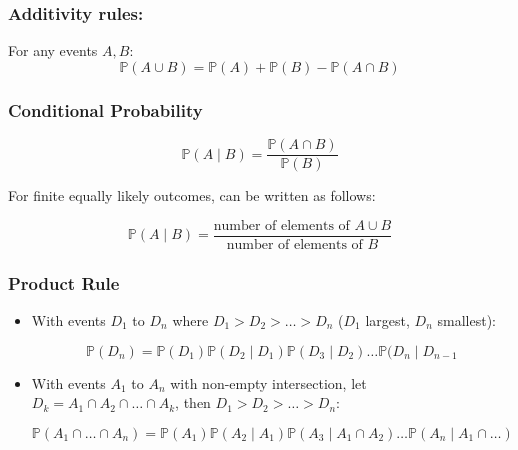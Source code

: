 \documentclass[10pt]{article}
\begin{document}

\begin{multicols}{2}
\subsubsection*{Additivity rules:}

For any events $A, B$:
\begin{equation}
  \tag{Event Union}
  \boxed{
    \mathbb{P}(A \cup B) = \mathbb{P}(A) + \mathbb{P}(B) -
    \mathbb{P}(A \cap B)
  }
\end{equation}


\columnbreak
\subsubsection*{Conditional Probability}

\begin{equation}
  \tag{Conditional Probability Def}
  \boxed{
    \mathbb{P}(A \mid B) = \frac{\mathbb{P}(A \cap B)}{\mathbb{P}(B)}
  }
\end{equation}

For finite equally likely outcomes, can be written as follows:

\begin{equation}
  \boxed{
    \mathbb{P}(A \mid B) = \frac{\text{number of elements of } A \cup
      B}{\text{number of elements of } B}
  }
\end{equation}
\end{multicols}

\subsubsection*{Product Rule}

\begin{itemize}
\item With events $D_1$ to $D_n$ where $D_1 > D_2 > \dots > D_n$
  ($D_1$ largest, $D_n$ smallest):

  \begin{equation}
    \tag{Product Rule 1}
    \boxed{
      \mathbb{P}(D_n) = \mathbb{P}(D_1) \mathbb{P}(D_2 \mid D_1)
      \mathbb{P}(D_3 \mid D_2) \dots \mathbb{P}(D_n \mid D_{n-1}
    }
  \end{equation}

\item With events $A_1$ to $A_n$ with non-empty intersection, let
  $D_k = A_1 \cap A_2 \cap \dots \cap A_k$, then
  $D_1 > D_2 > \dots > D_n$:

  \begin{equation}
    \tag{Product Rule 2}
    \boxed{
      \mathbb{P}(A_1 \cap \dots \cap A_n) = \mathbb{P}(A_1)
      \mathbb{P}(A_2 \mid A_1) \mathbb{P}(A_3 \mid A_1 \cap A_2) \dots
      \mathbb{P}(A_n \mid A_1 \cap \dots)
    }
  \end{equation}
\end{itemize}
\end{document}
